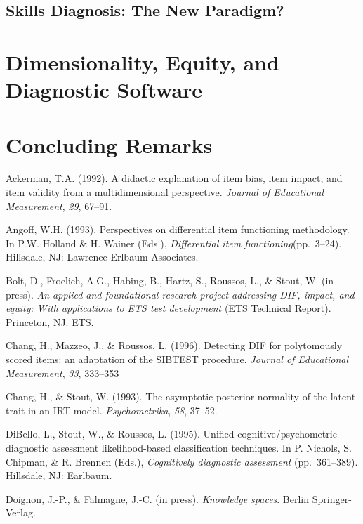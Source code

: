 \documentclass[titlepage,11pt,twoside]{article}
\begin{document}
\subsection{Skills Diagnosis: The New Paradigm?}


\section{Dimensionality, Equity, and Diagnostic Software}


\section{Concluding Remarks}

\vspace{\fill}\clearpage

\begin{thebibliography}

\bibitem Ackerman, T.A. (1992). A didactic explanation of item bias, item impact, and item validity from a multidimensional perspective. \textit{Journal of Educational Measurement}, \textit{29}, 67--91.

\bibitem Angoff, W.H. (1993). Perspectives on differential item functioning methodology. In P.W. Holland \& H. Wainer (Eds.), \textit{Differential item functioning}(pp.~3--24). Hillsdale, NJ: Lawrence Erlbaum Associates.

\bibitem Bolt, D., Froelich, A.G., Habing, B., Hartz, S., Roussos, L., \& Stout, W. (in press). \textit{An applied and foundational research project addressing DIF, impact, and equity: With applications to ETS test development} (ETS Technical Report). Princeton, NJ: ETS.

Chang, H., Mazzeo, J., \& Roussos, L. (1996). Detecting DIF for polytomously scored items: an adaptation of the SIBTEST procedure. \textit{Journal of Educational Measurement}, \textit{33}, 333--353

\bibitem Chang, H., \& Stout, W. (1993). The asymptotic posterior normality of the latent trait in an IRT model. \textit{Psychometrika}, \textit{58}, 37--52.


\bibitem DiBello, L., Stout, W., \& Roussos, L. (1995). Unified cognitive/psychometric diagnostic assessment likelihood-based classification techniques. In P. Nichols, S. Chipman, \& R. Brennen (Eds.), \textit{Cognitively diagnostic assessment} (pp.~361--389). Hillsdale, NJ: Earlbaum.

\bibitem Doignon, J.-P., \& Falmagne, J.-C. (in press). \textit{Knowledge spaces}. Berlin Springer-Verlag.


\end{thebibliography}
\end{document}
